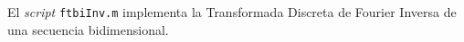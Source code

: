 \documentclass{article}
\begin{document}
\begin{ttfamily}
\begin{center}
\label{ftbi}
\end{center}
\end{ttfamily}

\par El \textit{script} \verb+ftbiInv.m+ implementa la Transformada Discreta de Fourier Inversa de una secuencia bidimensional.

\begin{ttfamily}
\begin{center}
\label{ftbiInv}
\end{center}
\end{ttfamily}
\end{document}
